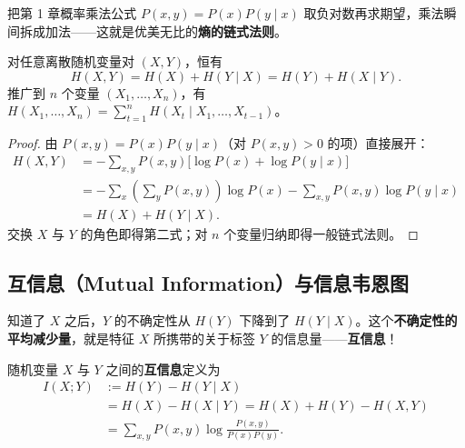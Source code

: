 把第 1 章概率乘法公式 $P(x, y) = P(x)P(y \mid x)$ 取负对数再求期望，乘法瞬间拆成加法——这就是优美无比的\textbf{熵的链式法则}。

\begin{thmBox}
\begin{theorem}
\label{thm:ch4-chain-rule}
对任意离散随机变量对 $(X, Y)$，恒有
\begin{equation}
  H(X, Y) = H(X) + H(Y \mid X) = H(Y) + H(X \mid Y). \label{eq:ch4-chain-rule}
\end{equation}
推广到 $n$ 个变量 $(X_1, \dots, X_n)$，有 $H(X_1, \dots, X_n) = \sum_{t=1}^n H(X_t \mid X_1, \dots, X_{t-1})$。
\end{theorem}
\end{thmBox}

\begin{proof}
由 $P(x, y) = P(x)P(y\mid x)$（对 $P(x,y)>0$ 的项）直接展开：
\begin{align*}
  H(X, Y)
  &= -\sum_{x,y} P(x,y)\bigl[\log P(x) + \log P(y\mid x)\bigr] \\
  &= -\sum_x \left(\sum_y P(x,y)\right)\log P(x) - \sum_{x,y} P(x,y)\log P(y\mid x) \\
  &= H(X) + H(Y \mid X).
\end{align*}
交换 $X$ 与 $Y$ 的角色即得第二式；对 $n$ 个变量归纳即得一般链式法则。
\end{proof}

\subsection{互信息（Mutual Information）与信息韦恩图}

知道了 $X$ 之后，$Y$ 的不确定性从 $H(Y)$ 下降到了 $H(Y\mid X)$。这个\textbf{不确定性的平均减少量}，就是特征 $X$ 所携带的关于标签 $Y$ 的信息量——\textbf{互信息}！

\begin{defBox}
\begin{definition}
\label{def:ch4-mi}
随机变量 $X$ 与 $Y$ 之间的\textbf{互信息}定义为
\begin{align}
  I(X; Y)
  &:= H(Y) - H(Y \mid X) \nonumber\\
  &= H(X) - H(X \mid Y)
   = H(X) + H(Y) - H(X, Y) \nonumber\\
  &= \sum_{x, y} P(x, y)\log\frac{P(x, y)}{P(x)P(y)}. \label{eq:ch4-mi}
\end{align}
\end{definition}
\end{defBox}

